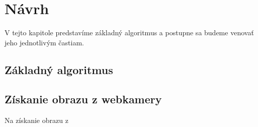\chapter{Návrh}\label{chap:design}

V tejto kapitole predstavíme základný algoritmus a postupne sa budeme venovať jeho jednotlivým častiam.
\bigskip

\section{Základný algoritmus}

\section{Získanie obrazu z webkamery}
Na získanie obrazu z 
